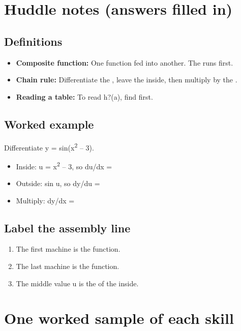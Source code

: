 \documentclass[11pt]{article}
\begin{document}
\section*{Huddle notes (answers filled in)}
\subsection*{Definitions}\begin{itemize}
\item \textbf{Composite function:} One function fed into another. The  runs first.
\item \textbf{Chain rule:} Differentiate the , leave the inside, then multiply by the .
\item \textbf{Reading a table:} To read h?(a), find  first.
\end{itemize}
\subsection*{Worked example}
Differentiate y = sin(x\textsuperscript{2} -- 3).\\
\begin{itemize}
\item Inside: u = x\textsuperscript{2} -- 3, so du/dx = 
\item Outside: sin u, so dy/du = 
\item Multiply: dy/dx = 
\end{itemize}
\subsection*{Label the assembly line}
\begin{enumerate}
\item The first machine is the  function.
\item The last machine is the  function.
\item The middle value u is the  of the inside.
\end{enumerate}
\section*{One worked sample of each skill}
\end{document}
